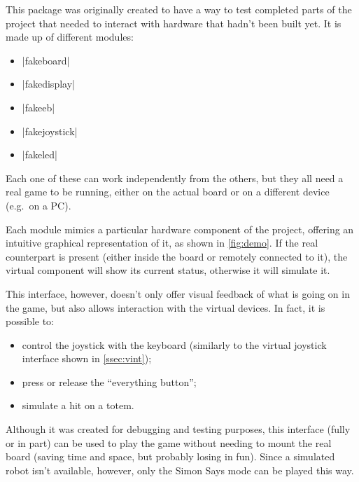 \beforelist* This package was originally created to have a way to test completed
parts of the project that needed to interact with hardware that hadn't been
built yet.
It is made up of different modules:
\begin{multicols}{2}
\begin{itemize}
  \item \Code|fakeboard|
  \item \Code|fakedisplay|
  \item \Code|fakeeb|
  \item \Code|fakejoystick|
  \item \Code|fakeled|
\end{itemize}
\end{multicols}
\afterlist
Each one of these can work independently from the others, but they all need a
real game to be running, either on the actual board or on a different device
(e.g.\ on a PC).

Each module mimics a particular hardware component of the project, offering an
intuitive graphical representation of it, as shown in \autoref{fig:demo}. If the
real counterpart is present (either inside the board or remotely connected to
it), the virtual component will show its current status, otherwise it will
simulate it.

\beforelist* This interface, however, doesn't only offer visual feedback of what
is going on in the game, but also allows interaction with the virtual
devices.
In fact, it is possible to:
\begin{itemize}
  \item control the joystick with the keyboard (similarly to the virtual
    joystick interface shown in \autoref{ssec:vint});
  \item press or release the \textquotedblleft{}everything button\textquotedblright{};
  \item simulate a hit on a totem.
\end{itemize}
\afterlist*
Although it was created for debugging and testing purposes, this interface
(fully or in part) can be used to play the game without needing to mount the
real board (saving time and space, but probably losing in fun).
Since a simulated robot isn't available, however, only the Simon Says mode can
be played this way.


